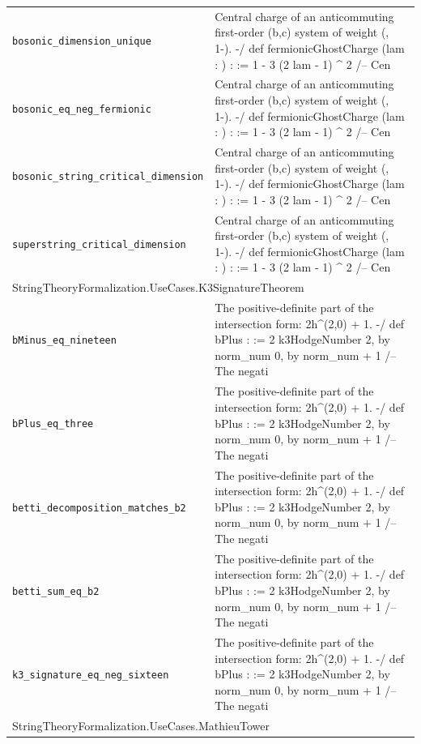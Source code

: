\begin{longtable}{p{}p{}}
\quad\texttt{\footnotesize bosonic\_dimension\_unique} & {\footnotesize Central charge of an anticommuting first-order (b,c) system of weight (, 1-). -/ def fermionicGhostCharge (lam : ) :  := 1 - 3 (2 lam - 1) \^{} 2 /-- Cen} \\
\quad\texttt{\footnotesize bosonic\_eq\_neg\_fermionic} & {\footnotesize Central charge of an anticommuting first-order (b,c) system of weight (, 1-). -/ def fermionicGhostCharge (lam : ) :  := 1 - 3 (2 lam - 1) \^{} 2 /-- Cen} \\
\quad\texttt{\footnotesize bosonic\_string\_critical\_dimension} & {\footnotesize Central charge of an anticommuting first-order (b,c) system of weight (, 1-). -/ def fermionicGhostCharge (lam : ) :  := 1 - 3 (2 lam - 1) \^{} 2 /-- Cen} \\
\quad\texttt{\footnotesize superstring\_critical\_dimension} & {\footnotesize Central charge of an anticommuting first-order (b,c) system of weight (, 1-). -/ def fermionicGhostCharge (lam : ) :  := 1 - 3 (2 lam - 1) \^{} 2 /-- Cen} \\
\multicolumn{2}{l}{\textsf{\small StringTheoryFormalization.UseCases.K3SignatureTheorem}} \\
\quad\texttt{\footnotesize bMinus\_eq\_nineteen} & {\footnotesize The positive-definite part of the intersection form: 2h\^{}(2,0) + 1. -/ def bPlus :  := 2 k3HodgeNumber 2, by norm\_num 0, by norm\_num + 1 /-- The negati} \\
\quad\texttt{\footnotesize bPlus\_eq\_three} & {\footnotesize The positive-definite part of the intersection form: 2h\^{}(2,0) + 1. -/ def bPlus :  := 2 k3HodgeNumber 2, by norm\_num 0, by norm\_num + 1 /-- The negati} \\
\quad\texttt{\footnotesize betti\_decomposition\_matches\_b2} & {\footnotesize The positive-definite part of the intersection form: 2h\^{}(2,0) + 1. -/ def bPlus :  := 2 k3HodgeNumber 2, by norm\_num 0, by norm\_num + 1 /-- The negati} \\
\quad\texttt{\footnotesize betti\_sum\_eq\_b2} & {\footnotesize The positive-definite part of the intersection form: 2h\^{}(2,0) + 1. -/ def bPlus :  := 2 k3HodgeNumber 2, by norm\_num 0, by norm\_num + 1 /-- The negati} \\
\quad\texttt{\footnotesize k3\_signature\_eq\_neg\_sixteen} & {\footnotesize The positive-definite part of the intersection form: 2h\^{}(2,0) + 1. -/ def bPlus :  := 2 k3HodgeNumber 2, by norm\_num 0, by norm\_num + 1 /-- The negati} \\
\multicolumn{2}{l}{\textsf{\small StringTheoryFormalization.UseCases.MathieuTower}} \\

\end{longtable}
